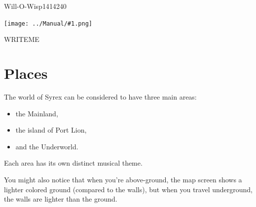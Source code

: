 \documentclass[10pt,twocolumn]{memoir}
\newcommand\pic[1]{%
  \begin{center}
    \texttt{[image: ../Manual/\#1.png]}
  \end{center}}
\begin{document}
\begin{monsterpage}{Will-O-Wisp}{14}{14}{2}{40}
  \pic{Will-O-Wisp}
  
  WRITEME
\end{monsterpage}

\chapter{Places}\label{ch:Places}

The world of Syrex can be considered to have three main areas:

\begin{itemize}
\item the Mainland,
\item the island of Port Lion,
\item and the Underworld.
\end{itemize}

Each area has its own distinct musical theme.

You  might also  notice that  when you're  above-ground, the  map screen
shows a  lighter colored ground  (compared to  the walls), but  when you
travel underground, the walls are lighter than the ground. 

\listofmaps
\end{document}
